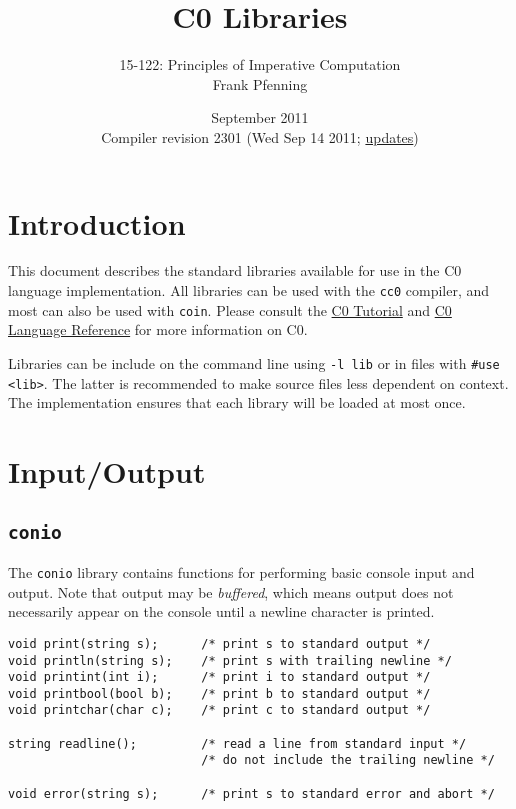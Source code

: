 \documentclass[11pt]{article}
\title{C0 Libraries}
\author{15-122: Principles of Imperative Computation \\ Frank Pfenning}
\date{September 2011\\Compiler revision 2301 (Wed Sep 14 2011;
  \hyperlink{sec:updates}{updates})}
\renewcommand{\_}{\char`\_}
\renewcommand{\{}{\char`\{}
\renewcommand{\}}{\char`\}}
\begin{document}
\maketitle

\section{Introduction}

This document describes the standard libraries available for use
in the C0 language implementation.  All libraries can be used
with the \verb'cc0' compiler, and most can also be used with
\verb'coin'.   Please consult the
\href{http://c0.typesafety.net/tutorial}{C0 Tutorial} and
\href{http://c0.typesafety.net/doc/c0-reference.pdf}{C0 Language
Reference} for more information on C0.

Libraries can be include on the command line using \verb'-l lib' or in
files with \verb'#use <lib>'.  The latter is recommended to make
source files less dependent on context.  The implementation ensures
that each library will be loaded at most once.

\section{Input/Output}

\subsection{\tt conio}

The \verb'conio' library contains functions for performing basic
console input and output.  Note that output may be \emph{buffered},
which means output does not necessarily appear on the console
until a newline character is printed.

\begin{small}
\begin{verbatim}
void print(string s);      /* print s to standard output */
void println(string s);    /* print s with trailing newline */
void printint(int i);      /* print i to standard output */
void printbool(bool b);    /* print b to standard output */
void printchar(char c);    /* print c to standard output */

string readline();         /* read a line from standard input */
                           /* do not include the trailing newline */

void error(string s);      /* print s to standard error and abort */
\end{verbatim}
\end{small}
\end{document}
